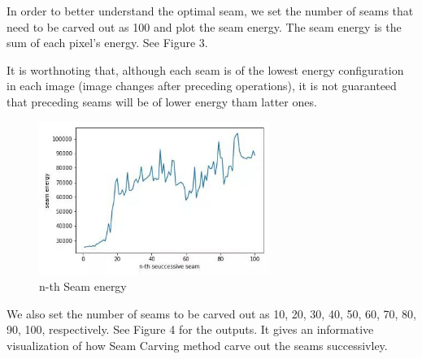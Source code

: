 \documentclass{article}
\begin{document}
	In order to better understand the optimal seam, we set the number of seams that need to be carved out as 100 and plot the seam energy. The seam energy is the sum of each pixel's energy. See Figure 3.

	It is worthnoting that, although each seam is of the lowest energy configuration in each image (image changes after preceding operations), it is not guaranteed that preceding seams will be of lower energy tham latter ones.

	\begin{figure}[htbp]
	\centering
	\includegraphics[height=5cm]{seam_energy.jpg}
	\caption{n-th Seam energy}
	\end{figure}

	We also set the number of seams to be carved out as 10, 20, 30, 40, 50, 60, 70, 80, 90, 100, respectively. See Figure 4 for the outputs. It gives an informative visualization of how Seam Carving method carve out the seams successivley.
\end{document}
